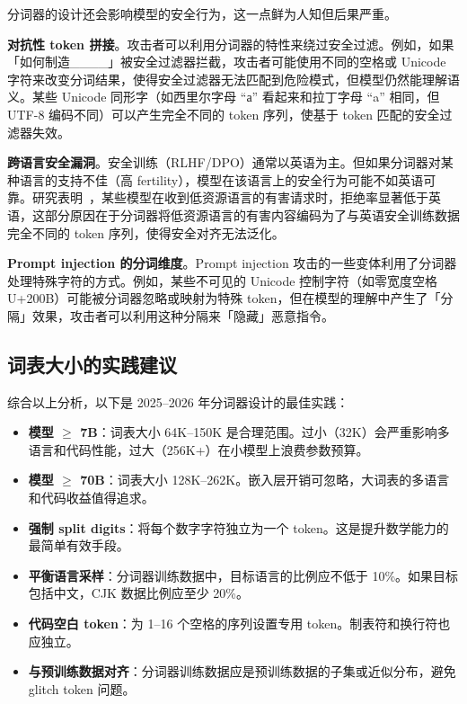 分词器的设计还会影响模型的安全行为，这一点鲜为人知但后果严重。

\textbf{对抗性 token 拼接}。攻击者可以利用分词器的特性来绕过安全过滤。例如，如果「如何制造\_\_\_\_」被安全过滤器拦截，攻击者可能使用不同的空格或 Unicode 字符来改变分词结果，使得安全过滤器无法匹配到危险模式，但模型仍然能理解语义。某些 Unicode 同形字（如西里尔字母 “а” 看起来和拉丁字母 “a” 相同，但 UTF-8 编码不同）可以产生完全不同的 token 序列，使基于 token 匹配的安全过滤器失效。

\textbf{跨语言安全漏洞}。安全训练（RLHF/DPO）通常以英语为主。但如果分词器对某种语言的支持不佳（高 fertility），模型在该语言上的安全行为可能不如英语可靠。研究表明~\cite{deng2024multilingual}，某些模型在收到低资源语言的有害请求时，拒绝率显著低于英语，这部分原因在于分词器将低资源语言的有害内容编码为了与英语安全训练数据完全不同的 token 序列，使得安全对齐无法泛化。

\textbf{Prompt injection 的分词维度}。Prompt injection 攻击的一些变体利用了分词器处理特殊字符的方式。例如，某些不可见的 Unicode 控制字符（如零宽度空格 U+200B）可能被分词器忽略或映射为特殊 token，但在模型的理解中产生了「分隔」效果，攻击者可以利用这种分隔来「隐藏」恶意指令。

\subsection{词表大小的实践建议}

综合以上分析，以下是 2025--2026 年分词器设计的最佳实践：

\begin{keybox}[分词器设计的最佳实践]
\begin{itemize}[noitemsep]
  \item \textbf{模型 $\geq$ 7B}：词表大小 64K--150K 是合理范围。过小（32K）会严重影响多语言和代码性能，过大（256K+）在小模型上浪费参数预算。
  \item \textbf{模型 $\geq$ 70B}：词表大小 128K--262K。嵌入层开销可忽略，大词表的多语言和代码收益值得追求。
  \item \textbf{强制 split digits}：将每个数字字符独立为一个 token。这是提升数学能力的最简单有效手段。
  \item \textbf{平衡语言采样}：分词器训练数据中，目标语言的比例应不低于 10\%。如果目标包括中文，CJK 数据比例应至少 20\%。
  \item \textbf{代码空白 token}：为 1--16 个空格的序列设置专用 token。制表符和换行符也应独立。
  \item \textbf{与预训练数据对齐}：分词器训练数据应是预训练数据的子集或近似分布，避免 glitch token 问题。
\end{itemize}
\end{keybox}

